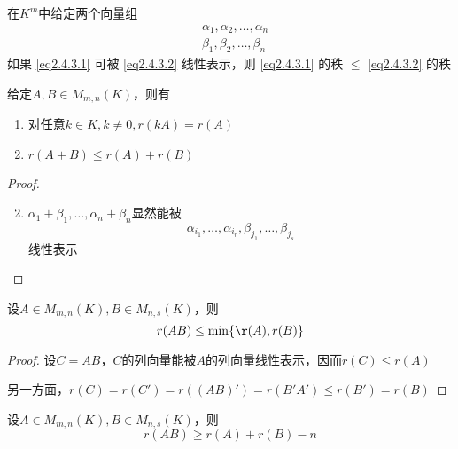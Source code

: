 \documentclass[11pt]{article}
\begin{document}
\begin{proposition}[]
在\(K^m\)中给定两个向量组
\begin{align}
&\alpha_1,\alpha_2,\dots,\alpha_n\label{eq2.4.3.1}\\
&\beta_1,\beta_2,\dots,\beta_n\label{eq2.4.3.2}
\end{align}
如果 \eqref{eq2.4.3.1} 可被 \eqref{eq2.4.3.2} 线性表示，则 \eqref{eq2.4.3.1} 的秩
\(\le\)
\eqref{eq2.4.3.2} 的秩
\end{proposition}

\begin{proposition}[]
给定\(A,B\in M_{m,n}(K)\)，则有
\begin{enumerate}
\item 对任意\(k\in K,k\neq0,r(kA)=r(A)\)
\item \(r(A+B)\le r(A)+r(B)\)
\end{enumerate}
\end{proposition}

\begin{proof}
\begin{enumerate}
\setcounter{enumi}{1}
\item \(\alpha_1+\beta_1,\dots,\alpha_n+\beta_n\)显然能被
\begin{equation*}
\alpha_{i_1},\dots,\alpha_{i_r},\beta_{j_1},\dots,\beta_{j_s}
\end{equation*}
线性表示
\end{enumerate}
\end{proof}

\begin{proposition}[]
设\(A\in M_{m,n}(K),B\in M_{n,s}(K)\)，则
\begin{equation*}
r(AB)\le\min\{\r(A),r(B)\}
\end{equation*}
\end{proposition}

\begin{proof}
设\(C=AB\)，\(C\)的列向量能被\(A\)的列向量线性表示，因而\(r(C)\le r(A)\)

另一方面，\(r(C)=r(C')=r((AB)')=r(B'A')\le r(B')=r(B)\)
\end{proof}

\begin{proposition}[]
设\(A\in M_{m,n}(K),B\in M_{n,s}(K)\)，则
\begin{equation*}
r(AB)\ge r(A)+r(B)-n
\end{equation*}
\end{proposition}
\end{document}
